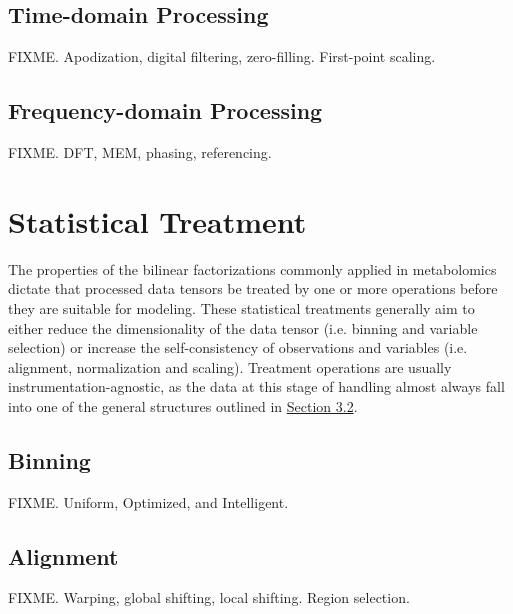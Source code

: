 \subsection{Time-domain Processing}

\begin{doublespace}
FIXME. Apodization, digital filtering, zero-filling. First-point scaling.
\end{doublespace}

\subsection{Frequency-domain Processing}

\begin{doublespace}
FIXME. DFT, MEM, phasing, referencing.
\end{doublespace}

\section{Statistical Treatment}

\begin{doublespace}
The properties of the bilinear factorizations commonly applied in metabolomics
dictate that processed data tensors be treated by one or more operations before
they are suitable for modeling. These statistical treatments generally aim to
either reduce the dimensionality of the data tensor (i.e. binning and variable
selection) or increase the self-consistency of observations and variables
(i.e. alignment, normalization and scaling). Treatment operations are usually
instrumentation-agnostic, as the data at this stage of handling almost always
fall into one of the general structures outlined in
\hyperlink{section.3.2}{Section 3.2}.
\end{doublespace}

\subsection{Binning}

\begin{doublespace}
FIXME. Uniform, Optimized, and Intelligent.
\end{doublespace}

\subsection{Alignment}

\begin{doublespace}
FIXME. Warping, global shifting, local shifting. Region selection.
\end{doublespace}

